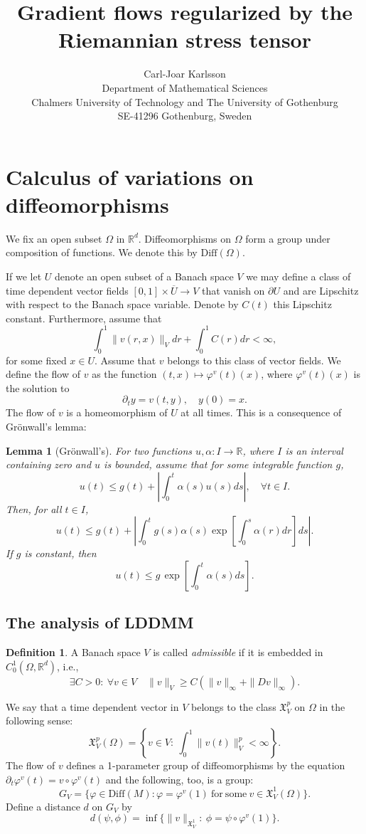 \documentclass[a5paper,11pt,twoside]{article}
\title{Gradient flows regularized by the Riemannian stress tensor}
\author{Carl-Joar Karlsson  \\ 
	\small Department of Mathematical Sciences \\
	\small Chalmers University of Technology and The University of Gothenburg\\
	\small SE-41296 Gothenburg, Sweden}
\theoremstyle{plain}
\newtheorem{lem}[teo]{Lemma}
\newcommand{\R}{\ensuremath{\mathbb{R}}}
\newcommand{\X}{\ensuremath{\mathfrak{X}}}
\newcommand{\Diff}{\ensuremath{\mathrm{Diff}}}
\theoremstyle{definition}
\newtheorem{defin}[teo]{Definition}
\begin{document}
\maketitle
\thispagestyle{empty}

\section[Calculus of variations]{Calculus of variations on diffeomorphisms}
We fix an open subset $\Omega$ in $\R^d$. Diffeomorphisms on $\Omega$ form a group under composition of functions. We denote this by $\Diff(\Omega)$.

If we let $U$ denote an open subset of a Banach space $V$ we may define a class of time dependent vector fields $[0,1]\times \overline{U}\to V$ that vanish on $\partial U$ and are Lipschitz with respect to the Banach space variable. Denote by $C(t)$ this Lipschitz constant. Furthermore, assume that
\[
\int_0^1\|v(r,x)\|_Vdr+\int_0^1 C(r)dr<\infty,
\]
for some fixed $x\in U$. Assume that $v$ belongs to this class of vector fields. We define the flow of $v$ as the function $(t,x)\mapsto\varphi^v(t)(x)$, where $\varphi^v(t)(x)$ is the solution to 
\[ \partial_t y=v(t,y),\quad y(0)=x. \]
The flow of $v$ is a homeomorphism of $U$ at all times. This is a consequence of Grönwall's lemma:

\begin{lem}[Grönwall's]
\label{gronwalls}
For two functions $u,\alpha:I\to \R$, where $I$ is an interval containing zero and $u$ is bounded, assume that for some integrable function $g$,
\[
u(t)\leq g(t)+\left|\int_0^t\alpha(s)u(s)ds\right|,\quad \forall t\in I.
\]
Then, for all $t\in I$,
\[
u(t)\leq g(t)+\left|\int_0^t g(s)\alpha(s)\exp[\int_0^s\alpha(r)dr]ds\right|.
\]
If $g$ is constant, then
\[
u(t)\leq g\,\exp\left[\int_0^t\alpha(s)ds\right].
\]
\end{lem}

\subsection{The analysis of LDDMM}

\begin{defin}
	A Banach space $V$ is called \textit{admissible} if it is embedded in $C_0^1(\Omega,\R^d)$, i.e., 
	\[
	\exists C>0: \ \forall v\in V\quad \|v\|_V\geq C(\|v\|_\infty+\|Dv\|_\infty).
	\]
\end{defin}

We say that a time dependent vector in $V$ belongs to the class $\X_V^p$ on $\Omega$ in the following sense:
\[
\X_V^p(\Omega)=\left\{v\in V:\ \int_0^1\|v(t)\|_V^p<\infty\right\}.
\]
The flow of $v$ defines a 1-parameter group of diffeomorphisms by the equation $\partial_t\varphi^v(t)=v\circ\varphi^v(t)$ and the following, too, is a group:
\[
G_V=\{\varphi\in \Diff(M): \varphi=\varphi^v(1)\ \mathrm{for\ some\ } v\in\X_V^1(\Omega)\}.
\]
Define a distance $d$ on $G_V$ by
\[
d(\psi,\phi)=\inf\{\|v\|_{\X_V^1}:\ \phi=\psi\circ\varphi^v(1)\}.
\]
\end{document}
